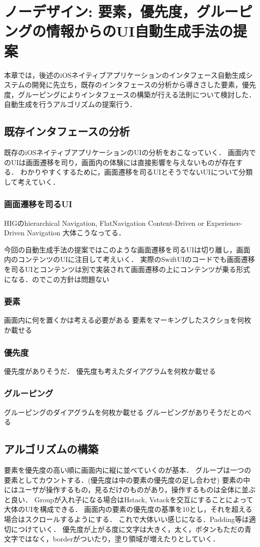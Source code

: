 \chapter{ノーデザイン: 要素，優先度，グルーピングの情報からのUI自動生成手法の提案}
\label{chap:auto-gen}

本章では，後述のiOSネイティブアプリケーションのインタフェース自動生成システムの開発に先立ち，既存のインタフェースの分析から導きさした要素，優先度，グルーピングによりインタフェースの構築が行える法則について検討した．自動生成を行うアルゴリズムの提案行う．
\section{既存インタフェースの分析}
既存のiOSネイティブアプリケーションのUIの分析をおこなっていく．
画面内でのUIは画面遷移を司り，画面内の体験には直接影響を与えないものが存在する．
わかりやすくするために，画面遷移を司るUIとそうでないUIについて分類して考えていく．
\subsection{画面遷移を司るUI}
HIGのhierarchical Navigation,
FlatNavigation
Content-Driven or Experience-Driven Navigation
大体こうなってる．


今回の自動生成手法の提案ではこのような画面遷移を司るUIは切り離し，画面内のコンテンツのUIに注目して考えいく．
実際のSwiftUIのコードでも画面遷移を司るUIとコンテンツは別で実装されて画面遷移の上にコンテンツが乗る形式になる．のでこの方針は問題ない



\subsection{要素}
画面内に何を置くかは考える必要がある
要素をマーキングしたスクショを何枚か載せる
\subsection{優先度}
優先度がありそうだ．
優先度も考えたダイアグラムを何枚か載せる
\subsection{グルーピング}
グルーピングのダイアグラムを何枚か載せる
グルーピングがありそうだとのべる

\section{アルゴリズムの構築}
要素を優先度の高い順に画面内に縦に並べていくのが基本．
グループは一つの要素としてカウントする．(優先度は中の要素の優先度の足し合わせ)
要素の中にはユーザが操作するもの，見るだけのものがあり，操作するものは全体に並ぶと良い．
Groupが入れ子になる場合はHstack, Vstackを交互にすることによって大体のUIを構成できる．
画面内の要素の優先度の基準を10とし，それを超える場合はスクロールするようにする．
これで大体いい感じになる．Padding等は適切につけていく．
優先度が上がる度に文字は大きく，太く，ボタンもただの青文字ではなく，borderがついたり，塗り領域が増えたりとしていく．

